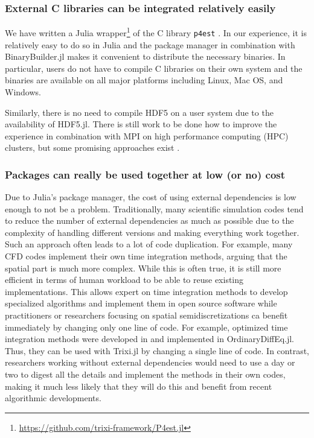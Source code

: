 \documentclass{juliacon}
\newcommand{\trixi}{Trixi.jl\xspace}
\begin{document}
\subsubsection{External C libraries can be integrated relatively easily}

We have written a Julia wrapper\footnote{\url{https://github.com/trixi-framework/P4est.jl}}
of the C library \texttt{p4est} \cite{burstedde2011p4est}. In our experience,
it is relatively easy to do so in Julia and the package manager in combination
with BinaryBuilder.jl makes it convenient to distribute the necessary binaries.
In particular, users do not have to compile C libraries on their own system
and the binaries are available on all major platforms including Linux, Mac OS,
and Windows.

Similarly, there is no need to compile HDF5 on a user system due to the
availability of HDF5.jl. There is still work to be done how to improve the
experience in combination with MPI on high performance computing (HPC) clusters,
but some promising approaches exist \cite{byrne2021mpi}.

\subsubsection{Packages can really be used together at low (or no) cost}

Due to Julia's package manager, the cost of using external dependencies is low
enough to not be a problem. Traditionally, many scientific simulation codes tend
to reduce the number of external dependencies as much as possible due to the
complexity of handling different versions and making everything work together.
Such an approach often leads to a lot of code duplication. For example, many
CFD codes implement their own time integration methods, arguing that the spatial
part is much more complex. While this is often true, it is still more efficient
in terms of human workload to be able to reuse existing implementations. This
allows expert on time integration methods to develop specialized algorithms and
implement them in open source software while practitioners or researchers focusing
on spatial semidiscretizations ca benefit immediately by changing only one line
of code. For example, optimized time integration methods were developed in
\cite{ranocha2021optimized} and implemented in OrdinaryDiffEq.jl. Thus, they
can be used with \trixi by changing a single line of code. In contrast, researchers
working without external dependencies would need to use a day or two to digest
all the details and implement the methods in their own codes, making it much
less likely that they will do this and benefit from recent algorithmic developments.
\end{document}
